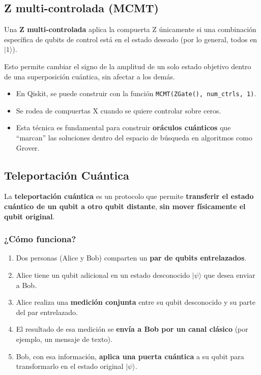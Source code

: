 \documentclass{article}
\begin{document}
\subsection*{Z multi-controlada (MCMT)}

Una \textbf{Z multi-controlada} aplica la compuerta Z únicamente si una combinación específica 
    de qubits de control está en el estado deseado (por lo general, todos en \(|1\rangle\)).

Esto permite cambiar el signo de la amplitud de un solo estado objetivo dentro de una 
superposición cuántica, sin afectar a los demás.

\begin{itemize}
    \item En Qiskit, se puede construir con la función \texttt{MCMT(ZGate(), num\_ctrls, 1)}.
    \item Se rodea de compuertas X cuando se quiere controlar sobre ceros.
    \item Esta técnica es fundamental para construir \textbf{oráculos cuánticos} que ``marcan'' 
            las soluciones dentro del espacio de búsqueda en algoritmos como Grover.
\end{itemize}


\subsection*{Teleportación Cuántica}

La \textbf{teleportación cuántica} es un protocolo que permite \textbf{transferir el estado cuántico de un qubit a otro qubit distante}, \textbf{sin mover físicamente el qubit original}.

\subsubsection*{¿Cómo funciona?}

\begin{enumerate}
    \item Dos personas (Alice y Bob) comparten un \textbf{par de qubits entrelazados}.
    \item Alice tiene un qubit adicional en un estado desconocido $\vert \psi \rangle$ que desea enviar a Bob.
    \item Alice realiza una \textbf{medición conjunta} entre su qubit desconocido y su parte del par entrelazado.
    \item El resultado de esa medición se \textbf{envía a Bob por un canal clásico} (por ejemplo, un mensaje de texto).
    \item Bob, con esa información, \textbf{aplica una puerta cuántica} a su qubit para transformarlo en el estado original $\vert \psi \rangle$.
\end{enumerate}
\end{document}
